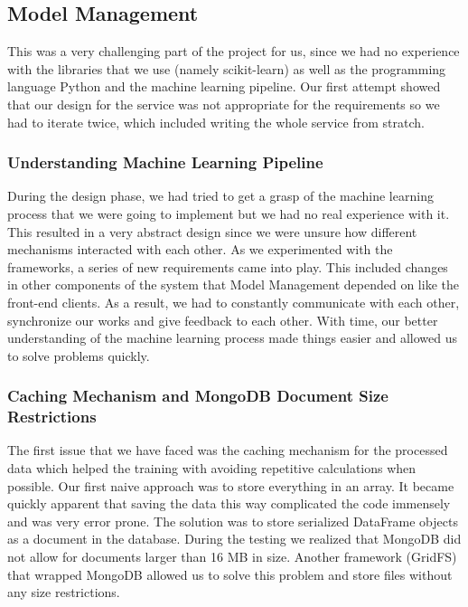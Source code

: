 \subsection{Model Management}
This was a very challenging part of the project for us, since we had no 
experience with the libraries that we use (namely scikit-learn) as well
as the programming language Python and the machine learning pipeline. Our first
attempt showed that our design for the service was not appropriate for the requirements
so we had to iterate twice, which included writing the whole service from
stratch.

\subsubsection{Understanding Machine Learning Pipeline}
During the design phase, we had tried to get a grasp of the machine learning
process that we were going to implement but we had no real experience with it.
This resulted in a very abstract design since we were unsure how different
mechanisms interacted with each other. As we experimented with the frameworks,
a series of new requirements came into play. This included changes in other
components of the system that Model Management depended on like the front-end
clients. As a result, we had to constantly communicate with each
other, synchronize our works and give feedback to each other. With time, our
better understanding of the machine learning process made things easier and
allowed us to solve problems quickly.

\subsubsection{Caching Mechanism and MongoDB Document Size Restrictions}
The first issue that we have faced was the caching mechanism for the processed
data which helped the training with avoiding repetitive calculations when
possible. Our first naive approach was to store everything in an array. It
became quickly apparent that saving the data this way complicated the code
immensely and was very error prone. The solution was to store serialized
DataFrame objects as a document in the database. During the testing we realized
that MongoDB did not allow for documents larger than 16 MB in size. Another
framework (GridFS) that wrapped MongoDB allowed us to solve this problem and
store files without any size restrictions.

